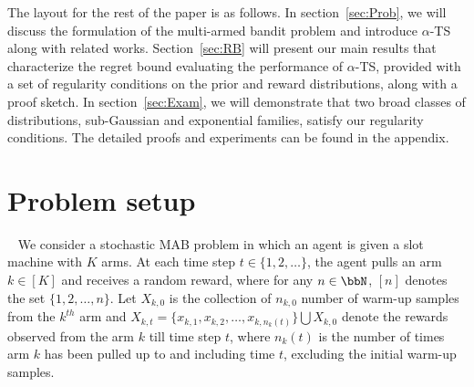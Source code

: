 \documentclass[11pt]{article}
\begin{document}
The layout for the rest of the paper is as follows. In section~\ref{sec:Prob}, we will discuss the formulation of the multi-armed bandit problem and introduce $\alpha$-TS along with related works. Section~\ref{sec:RB} will present our main results that characterize the regret bound evaluating the performance of $\alpha$-TS, provided with a set of regularity conditions on the prior and reward distributions, along with a proof sketch. In section~\ref {sec:Exam}, we will demonstrate that two broad classes of distributions, sub-Gaussian and exponential families, satisfy our regularity conditions. The detailed proofs and experiments can be found in the appendix.

\section{Problem setup}~\label{sec:Prob}
We consider a stochastic MAB problem in which an agent is given a slot machine with $K$ arms.
At each time step $t\in\{1,2,\ldots\}$, the agent pulls an arm $k\in [K]$ and receives a random reward, where for any $n \in \bbN$, $[n]$ denotes the set $\{1,2,\ldots,n\}$. Let $X_{k,0}$ is the collection {of $n_{k,0}$ number} of warm-up samples from the $k^{th}$ arm and $X_{k,t}=\{x_{k,1},x_{k,2},\ldots,x_{k,n_k(t)} \} \bigcup X_{k,0} $ denote the rewards observed from the arm $k$ till time step $t$, where $n_{k}(t)$ is the number of times arm $k$ has been pulled up to and including time $t$, excluding the initial warm-up samples. 
\end{document}
